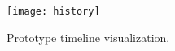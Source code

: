 \begin{figure}[ht]
  \texttt{[image: history]}
  \caption[Timeline]{Prototype timeline visualization.}
  \label{fig:history}
  \centering
\end{figure}